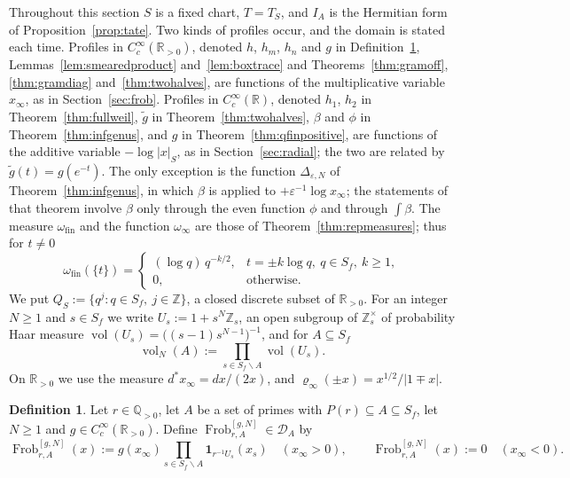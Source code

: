 \documentclass[11pt]{amsart}
\theoremstyle{definition}
\newtheorem{definition}[theorem]{Definition}
\newcommand{\R}{\mathbb R}
\newcommand{\Z}{\mathbb Z}
\newcommand{\Q}{\mathbb Q}
\newcommand{\Frob}{\operatorname{Frob}}
\newcommand{\vol}{\operatorname{vol}}
\newcommand{\DA}{\mathcal D_A}
\begin{document}
Throughout this section $S$ is a fixed chart, $T=T_S$, and
$I_A$ is the Hermitian form of Proposition~\ref{prop:tate}. Two kinds of
profiles occur, and the domain is stated each time. Profiles in
$C_c^\infty(\R_{>0})$, denoted $h$, $h_m$, $h_n$ and $g$ in
Definition~\ref{def:smearedrF}, Lemmas~\ref{lem:smearedproduct}
and~\ref{lem:boxtrace} and Theorems~\ref{thm:gramoff}, \ref{thm:gramdiag}
and~\ref{thm:twohalves}, are functions of the multiplicative variable
$x_\infty$, as in Section~\ref{sec:frob}. Profiles in $C_c^\infty(\R)$,
denoted $h_1$, $h_2$ in Theorem~\ref{thm:fullweil}, $\tilde g$ in
Theorem~\ref{thm:twohalves}, $\beta$ and $\phi$ in
Theorem~\ref{thm:infgenus}, and $g$ in Theorem~\ref{thm:qfinpositive}, are
functions of the additive variable $-\log|x|_S$, as in
Section~\ref{sec:radial}; the two are related by $\tilde g(t)=g(e^{-t})$.
The only exception is the function $\Delta_{\varepsilon,N}$ of
Theorem~\ref{thm:infgenus}, in which $\beta$ is applied to
$+\varepsilon^{-1}\log x_\infty$; the statements of that theorem involve
$\beta$ only through the even function $\phi$ and through $\int\beta$.
The measure $\omega_{\mathrm{fin}}$ and the
function $\omega_\infty$ are those of Theorem~\ref{thm:repmeasures}; thus for
$t\ne0$
\[
  \omega_{\mathrm{fin}}(\{t\})=
  \begin{cases}
   (\log q)\,q^{-k/2}, & t=\pm k\log q,\ q\in S_f,\ k\ge1,\\
   0, & \text{otherwise.}
  \end{cases}
\]
We put $Q_S:=\{q^j:q\in S_f,\ j\in\Z\}$, a closed discrete subset of
$\R_{>0}$. For an integer $N\ge1$ and $s\in S_f$ we write $U_s:=1+s^N\Z_s$,
an open subgroup of $\Z_s^\times$ of probability Haar measure
$\vol(U_s)=\bigl((s-1)s^{N-1}\bigr)^{-1}$, and for $A\subseteq S_f$
\begin{equation}\label{eq:VN}
  \vol_N(A):=\prod_{s\in S_f\smallsetminus A}\vol(U_s).
\end{equation}
On $\R_{>0}$ we use the measure $d^*x_\infty=dx/(2x)$, and
$\varrho_\infty(\pm x)=x^{1/2}/|1\mp x|$.

\begin{definition}\label{def:smearedrF}
Let $r\in\Q_{>0}$, let $A$ be a set of primes with $P(r)\subseteq A\subseteq
S_f$, let $N\ge1$ and $g\in C_c^\infty(\R_{>0})$. Define
$\Frob_{r,A}^{[g,N]}\in\DA$ by
\[
  \Frob_{r,A}^{[g,N]}(x):=g(x_\infty)\prod_{s\in S_f\smallsetminus A}
   \mathbf 1_{r^{-1}U_s}(x_s)\quad(x_\infty>0),\qquad
  \Frob_{r,A}^{[g,N]}(x):=0\quad(x_\infty<0).
\]
\end{definition}
\end{document}
